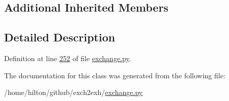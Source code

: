 \subsection*{Additional Inherited Members}


\subsection{Detailed Description}


Definition at line \hyperlink{exchange_8py_source_l00252}{252} of file \hyperlink{exchange_8py_source}{exchange.\+py}.



The documentation for this class was generated from the following file\+:\begin{DoxyCompactItemize}
\item 
/home/hilton/github/exch2exh/\hyperlink{exchange_8py}{exchange.\+py}\end{DoxyCompactItemize}
